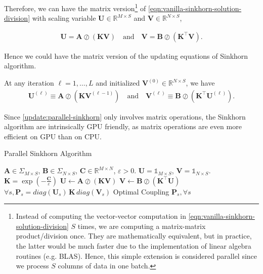 Therefore, we can have the matrix version\footnote{
  Instead of computing the vector-vector computation in \cref{eqn:vanilla-sinkhorn-solution-division} $S$ times,
  we are computing a matrix-matrix product/division once.
  They are mathematically equivalent, but in practice,
  the latter would be much faster due to the implementation of linear algebra routines (e.g. BLAS).
  Hence, this simple extension is considered parallel since we process $S$ columns of data in one batch.
} of \cref{eqn:vanilla-sinkhorn-solution-division} with scaling variable
$\mathbf{U} \in \mathbb{R}^{M\times S}$ and $\mathbf{V} \in \mathbb{R}^{N\times S}$,

\begin{equation}
  \begin{aligned}
    \mathbf{U} = \mathbf{A} \oslash (\mathbf{K}\mathbf{V})
    \quad\text{and}\quad
    \mathbf{V} = \mathbf{B} \oslash (\mathbf{K}^\top \mathbf{V}).
  \end{aligned}
\end{equation}

Hence we could have the matrix version of the updating equations of Sinkhorn algorithm.

\begin{update}\label{update:parallel-sinkhorn}
  At any iteration $\ell = 1, \ldots, L$ and initialized $\mathbf{V}^{(0)} \in \mathbb{R}^{N\times S}$, we have
  \begin{equation}
    \begin{aligned}
      \mathbf{U}^{(\ell)} \equiv \mathbf{A} \oslash (\mathbf{K} \mathbf{V}^{(\ell-1)})
      \quad\text{and}\quad
      \mathbf{V}^{(\ell)} \equiv \mathbf{B} \oslash (\mathbf{K}^\top \mathbf{U}^{(\ell)}).
    \end{aligned}
  \end{equation}
\end{update}

\begin{remark}[]
  Since \cref{update:parallel-sinkhorn} only involves matrix operations,
  the Sinkhorn algorithm are intrinsically GPU friendly, as matrix operations are even more efficient on GPU than on CPU.
\end{remark}


\begin{algorithm}[H]
  \caption{Parallel Sinkhorn Algorithm}
  \begin{algorithmic}[1]\label{algo:parallel-sinkhorn}
    \Require $\mathbf{A} \in \Sigma_{M\times S}$, $\mathbf{B}\in \Sigma_{N\times S}$, $\mathbf{C} \in \mathbb{R}^{M\times N}$, $\varepsilon > 0$.
    \Initialize $\mathbf{U} = \mathbb{1}_{M \times S}$, $\mathbf{V} = \mathbb{1}_{N \times S}$.
    \State $\mathbf{K} = \exp(-\frac{\mathbf{C}}{\varepsilon})$
    \State $\mathbf{U} \leftarrow \mathbf{A} \oslash (\mathbf{K} \mathbf{V})$
    \State $\mathbf{V} \leftarrow \mathbf{B} \oslash (\mathbf{K}^\top \mathbf{U})$
    \EndWhile
    \State $\forall s, \mathbf{P}_s = diag(\mathbf{U}_s) \, \mathbf{K} \, diag(\mathbf{V}_s)$
    \Ensure Optimal Coupling $\mathbf{P}_s, \forall s$
  \end{algorithmic}
\end{algorithm}

